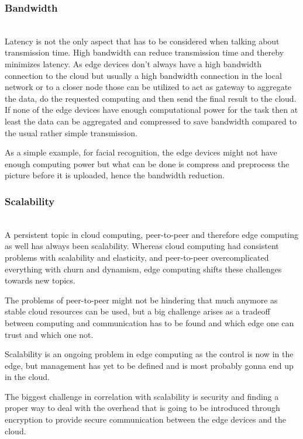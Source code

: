 \subsubsection{Bandwidth}\hspace*{\fill} \\
Latency is not the only aspect that has to be considered when talking about transmission time. High bandwidth can reduce transmission time and thereby minimizes latency.
As edge devices don’t always have a high bandwidth connection to the cloud but usually a high bandwidth connection in the local network or to a closer node those can be utilized to act as gateway to aggregate the data, do the requested computing and then send the final result to the cloud. If none of the edge devices have enough computational power for the task then at least the data can be aggregated and compressed to save bandwidth compared to the usual rather simple transmission.

As a simple example, for facial recognition, the edge devices might not have enough computing power but what can be done is compress and preprocess the picture before it is uploaded, hence the bandwidth reduction.

\subsubsection{Scalability}\hspace*{\fill} \\
A persistent topic in cloud computing, peer-to-peer and therefore edge computing as well has always been scalability.
Whereas cloud computing had consistent problems with scalability and elasticity, and peer-to-peer overcomplicated everything with churn and dynamism, edge computing shifts these challenges towards new topics.

The problems of peer-to-peer might not be hindering that much anymore as stable cloud resources can be used, but a big challenge arises as a tradeoff between computing and communication has to be found  and which edge one can trust and which one not.

Scalability is an ongoing problem in edge computing as the control is now in the edge, but management has yet to be defined and is most probably gonna end up in the cloud.

The biggest challenge in correlation with scalability is security and finding a proper way to deal with the overhead that is going to be introduced through encryption to provide secure communication between the edge devices and the cloud.


